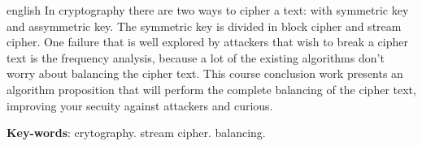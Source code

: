 \begin{resumo}[Abstract]
 \begin{otherlanguage*}{english}
	In cryptography there are two ways to cipher a text: with symmetric key and assymmetric key. The symmetric key is divided in  block cipher and stream cipher. One failure that is well explored by attackers that wish to break a cipher text is the frequency analysis, because a lot of the existing algorithms don't worry about balancing the cipher text. This course conclusion work presents an algorithm proposition that will perform the complete balancing of the cipher text, improving your secuity against attackers and curious. 
   \vspace{\onelineskip}
 
   \noindent 
   \textbf{Key-words}: crytography. stream cipher. balancing.
 \end{otherlanguage*}
\end{resumo}
